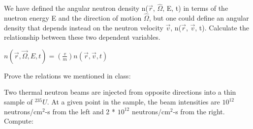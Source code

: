 \documentclass[12pts,answers]{exam}
\begin{document}
\begin{questions}
        \question[10] We have defined the angular neutron density n($\vec{r}$, $\hat{\Omega}$, E, t) in terms of the nuetron energy
        E and the direction of motion $\hat{\Omega}$, but one could define an angular density that depends instead on the
        neutron velocity $\vec{v}$, n($\vec{r}$, $\vec{v}$, t). Calculate the relationship between these two dependent variables.


        \begin{solution}
            $n(\vec{r},\vec{\Omega}, E, t) = \left(\frac{v}{m}\right) n(\vec{r},\vec{v},t)$
        \end{solution}
        \pagebreak
        \question Prove the relations we mentioned in class:

        \pagebreak

        \question Two thermal neutron beams are injected from opposite directions into a thin sample of $^{235}U$. At a given
        point in the sample, the beam intensities are $10^{12}$ neutrons/cm$^2$-s from the left and 2 * $10^{12}$ neutrons/cm$^2$-s from the right. Compute:

        \pagebreak


\end{questions}
\end{document}
